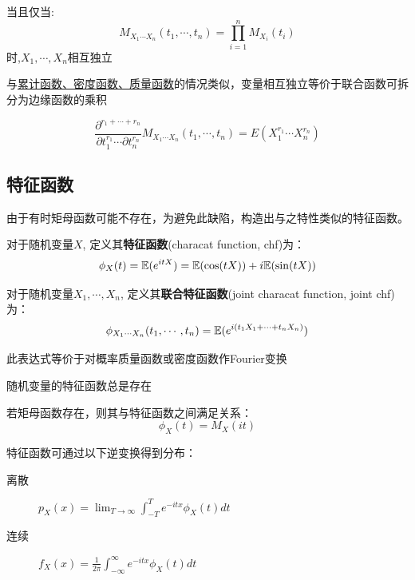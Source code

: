 \begin{theorem}
    当且仅当:
    \[ M_{X_1\cdots X_n}(t_1,\cdots ,t_n) = \prod_{i=1}^n M_{X_i}(t_i) \]
    时,$X_1,\cdots, X_n$相互独立
\end{theorem}

\begin{remark}
    与\underline{累计函数、密度函数、质量函数}的情况类似，变量相互独立等价于联合函数可拆分为边缘函数的乘积
\end{remark}

\begin{theorem}
    \[ \frac{\partial^{r_1+\cdots +r_n} }{\partial t_1^{r_1} \cdots  \partial t_n^{r_n}} M_{X_1\cdots X_n}(t_1,\cdots ,t_n) = E(X_1^{r_1} \cdots X_n^{r_n}) \]
\end{theorem}

\subsection{特征函数}

由于有时矩母函数可能不存在，为避免此缺陷，构造出与之特性类似的特征函数。

\begin{definition}
    对于随机变量$X$, 定义其\textbf{特征函数}(characat function, chf)为：
    \[ \phi_X(t) = \mathbb{E}(e^{itX}) = \mathbb{E}(\cos (tX)) + i\mathbb{E}(\sin (tX))\]

    对于随机变量$X_1,\cdots, X_n$, 定义其\textbf{联合特征函数}(joint characat function, joint chf)为：
    \[ \phi_{X_1\cdots X_n}(t_1,\cdots ,t_n) = \mathbb{E}(e^{i (t_1 X_1+\cdots + t_n X_n)}) \]
\end{definition}

\begin{remark}
    此表达式等价于对概率质量函数或密度函数作Fourier变换
\end{remark}

\begin{proposition}
    随机变量的特征函数总是存在
\end{proposition}

\begin{proposition}
    若矩母函数存在，则其与特征函数之间满足关系：
    \[ \phi_X(t) = M_X(it) \]
\end{proposition}

\begin{theorem}
    特征函数可通过以下逆变换得到分布：
    \begin{description}
        \item[离散]$p_{X}(x)=\lim _{T \rightarrow \infty} \int_{-T}^{T} e^{-i t x} \phi_{X}(t) d t$
        \item[连续]$f_X(x)=\frac1{2 \pi} \int_{-\infty}^{\infty} e^{-i t x} \phi_{X}(t) d t$
    \end{description}
\end{theorem}

